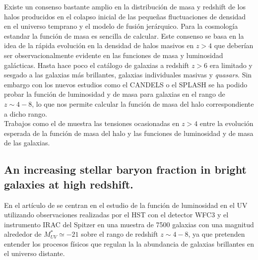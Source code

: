 \documentclass{article}
\begin{document}
Existe un consenso bastante amplio en la distribución de masa y redshift de los halos producidos en el colapso inicial de las pequeñas fluctuaciones de densidad en el universo temprano y el modelo de fusión jerárquico. Para la cosmología estandar la función de masa es sencilla de calcular. Este consenso se basa en la idea de la rápida evolución en la densidad de halos masivos en $z>4$ que deberían ser observacionalmente evidente en las funciones de masa y luminosidad galácticas. Hasta hace poco el catálogo de galaxias a redshift $z>6$ era limitado y sesgado a las galaxias más brillantes, galaxias individuales masivas y \textit{quasars}. Sin embargo con los nuevos estudios como el CANDELS o el SPLASH se ha podido probar la función de luminosidad y de masa para galaxias en el rango de $z\sim 4-8$, lo que nos permite calcular la función de masa del halo correspondiente a dicho rango.\\

Trabajos como el de \cite{finkelstein2015increasing} muestra las tensiones ocasionadas en $z>4$ entre la evolución esperada de la función de masa del halo y las funciones de luminosidad y de masa de las galaxias. \\

\subsection*{An increasing stellar baryon fraction in bright galaxies at high redshift.}
En el artículo de \cite{finkelstein2015increasing} se centran en el estudio de la función de luminosidad en el UV utilizando observaciones realizadas por el HST con el detector WFC3 y el instrumento IRAC del Spitzer en una muestra de 7500 galaxias con una magnitud alrededor de $M_{UV}^*\simeq -21$ sobre el rango de redshift $z\sim 4-8$, ya que pretenden entender los procesos físicos que regulan la la abundancia de galaxias brillantes en el universo distante. \\
\end{document}
